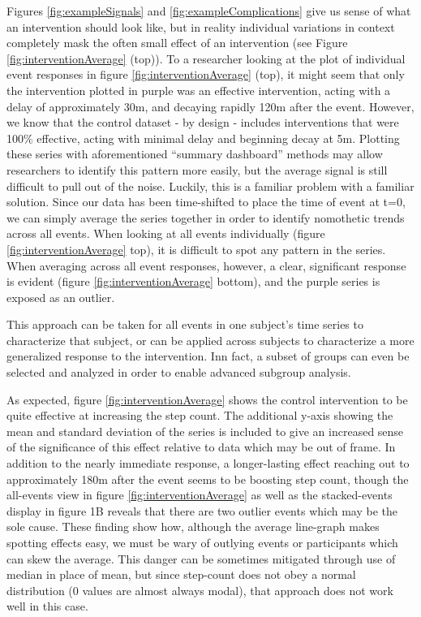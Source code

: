 Figures \ref{fig:exampleSignals} and \ref{fig:exampleComplications} give us sense of what an intervention should look like, but in reality individual variations in context completely mask the often small effect of an intervention (see Figure \ref{fig:interventionAverage} (top)).
To a researcher looking at the plot of individual event responses in figure \ref{fig:interventionAverage} (top), it might seem that only the intervention plotted in purple was an effective intervention, acting with a delay of approximately 30m, and decaying rapidly 120m after the event.
However, we know that the control dataset - by design - includes interventions that were 100\% effective, acting with minimal delay and beginning decay at 5m.
Plotting these series with aforementioned ``summary dashboard'' methods may allow researchers to identify this pattern more easily, but the average signal is still difficult to pull out of the noise.
Luckily, this is a familiar problem with a familiar solution.
Since our data has been time-shifted to place the time of event at t=0, we can simply average the series together in order to identify nomothetic trends across all events.
When looking at all events individually (figure \ref{fig:interventionAverage} top), it is difficult to spot any pattern in the series.
When averaging across all event responses, however, a clear, significant response is evident (figure \ref{fig:interventionAverage} bottom), and the purple series is exposed as an outlier.

This approach can be taken for all events in one subject's time series to characterize that subject, or can be applied across subjects to characterize a more generalized response to the intervention.
Inn fact, a subset of groups can even be selected and analyzed in order to enable advanced subgroup analysis.

As expected, figure \ref{fig:interventionAverage} shows the control intervention to be quite effective at increasing the step count.
The additional y-axis showing the mean and standard deviation of the series is included to give an increased sense of the significance of this effect relative to data which may be out of frame.
In addition to the nearly immediate response, a longer-lasting effect reaching out to approximately 180m after the event seems to be boosting step count, though the all-events view in figure \ref{fig:interventionAverage} as well as the stacked-events display in figure 1B reveals that there are two outlier events which may be the sole cause.
These finding show how, although the average line-graph makes spotting effects easy, we must be wary of outlying events or participants which can skew the average.
This danger can be sometimes mitigated through use of median in place of mean, but since step-count does not obey a normal distribution (0 values are almost always modal), that approach does not work well in this case.

